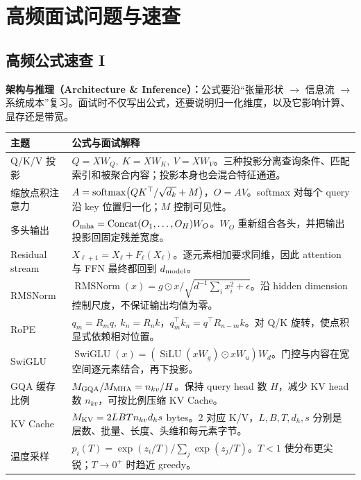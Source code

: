 \part{高频面试问题与速查}

\chapter{高频公式速查 I}\label{sec:formula-cheatsheet}

\begin{takeawaybox}
\textbf{架构与推理（Architecture \& Inference）：}公式要沿“张量形状 $\rightarrow$ 信息流 $\rightarrow$ 系统成本”复习。面试时不仅写出公式，还要说明归一化维度，以及它影响计算、显存还是带宽。
\end{takeawaybox}

\renewcommand{\arraystretch}{1.18}
\noindent\begin{tabularx}{\textwidth}{p{}Y}
\toprule
主题 & 公式与面试解释\\
\midrule
Q/K/V 投影 & $Q=XW_Q,\ K=XW_K,\ V=XW_V$。三种投影分离查询条件、匹配索引和被聚合内容；投影本身也会混合特征通道。\\[0.45em]
缩放点积注意力 & $A=\operatorname{softmax}\!\left(QK^\top/\sqrt{d_k}+M\right)$，$O=AV$。softmax 对每个 query 沿 key 位置归一化；$M$ 控制可见性。\\[0.45em]
多头输出 & $O_{\rm mha}=\operatorname{Concat}(O_1,\ldots,O_H)W_O$。$W_O$ 重新组合各头，并把输出投影回固定残差宽度。\\[0.45em]
Residual stream & $X_{\ell+1}=X_\ell+F_\ell(X_\ell)$。逐元素相加要求同维，因此 attention 与 FFN 最终都回到 $d_{\rm model}$。\\[0.45em]
RMSNorm & $\operatorname{RMSNorm}(x)=g\odot x/\sqrt{d^{-1}\sum_i x_i^2+\epsilon}$。沿 hidden dimension 控制尺度，不保证输出均值为零。\\[0.45em]
RoPE & $q_m=R_mq,\ k_n=R_nk$，$q_m^\top k_n=q^\top R_{n-m}k$。对 Q/K 旋转，使点积显式依赖相对位置。\\[0.45em]
SwiGLU & $\operatorname{SwiGLU}(x)=\left(\operatorname{SiLU}(xW_g)\odot xW_u\right)W_d$。门控与内容在宽空间逐元素结合，再下投影。\\[0.45em]
GQA 缓存比例 & $M_{\rm GQA}/M_{\rm MHA}=n_{kv}/H$。保持 query head 数 $H$，减少 KV head 数 $n_{kv}$，可按比例压缩 KV Cache。\\[0.45em]
KV Cache & $M_{\rm KV}=2LBTn_{kv}d_hs$ bytes。$2$ 对应 K/V，$L,B,T,d_h,s$ 分别是层数、批量、长度、头维和每元素字节。\\[0.45em]
温度采样 & $p_i(T)=\exp(z_i/T)/\sum_j\exp(z_j/T)$。$T<1$ 使分布更尖锐；$T\to0^+$ 时趋近 greedy。\\
\bottomrule
\end{tabularx}


